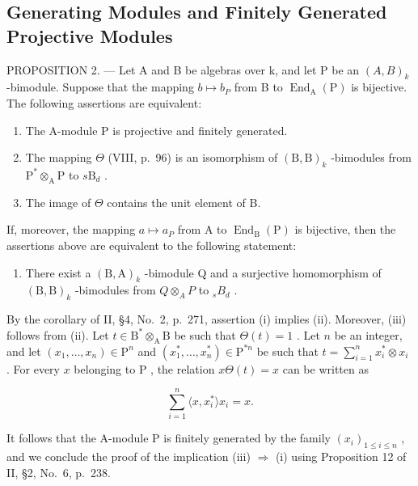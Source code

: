 \subsection{Generating Modules and Finitely Generated Projective Modules}

PROPOSITION 2. --- Let A and B be algebras over k, and let P be an \((A,B)_{k}\) -bimodule. Suppose that the mapping \(b \mapsto b_{P}\) from B to \(\operatorname{End}_{\mathrm{A}}(\mathrm{P})\) is bijective. The following assertions are equivalent:

\begin{enumerate}
\def\labelenumi{(\roman{enumi})}
\item
  The A-module P is projective and finitely generated.
\item
  The mapping \(\Theta\) (VIII, p.~96) is an isomorphism of \((\mathrm{B},\mathrm{B})_k\) -bimodules from \(\mathrm{P}^* \otimes_{\mathrm{A}} \mathrm{P}\) to \(s\mathrm{B}_d\) .
\item
  The image of \(\Theta\) contains the unit element of B.
\end{enumerate}

If, moreover, the mapping \(a \mapsto a_{P}\) from A to \(\operatorname{End}_{\mathrm{B}}(\mathrm{P})\) is bijective, then the assertions above are equivalent to the following statement:

\begin{enumerate}
\def\labelenumi{(\roman{enumi})}
\setcounter{enumi}{3}
\tightlist
\item
  There exist a \((\mathrm{B},\mathrm{A})_{k}\) -bimodule Q and a surjective homomorphism of \((\mathrm{B},\mathrm{B})_{k}\) -bimodules from \(Q\otimes_{A}P\) to \(_{s}B_{d}\) .
\end{enumerate}

By the corollary of II, §4, No.~2, p.~271, assertion (i) implies (ii). Moreover, (iii) follows from (ii). Let \(t \in \mathrm{B}^* \otimes_{\mathrm{A}} \mathrm{B}\) be such that \(\Theta(t) = 1\) . Let \(n\) be an integer, and let \((x_1, \ldots, x_n) \in \mathrm{P}^n\) and \((x_1^*, \ldots, x_n^*) \in \mathrm{P}^{*n}\) be such that \(t = \sum_{i=1}^{n} x_i^* \otimes x_i\) . For every \(x\) belonging to \(\mathrm{P}\) , the relation \(x\Theta(t) = x\) can be written as

\[
\sum_ {i = 1} ^ {n} \langle x, x _ {i} ^ {*} \rangle x _ {i} = x.
\]

It follows that the A-module P is finitely generated by the family \((x_{i})_{1\leqslant i\leqslant n}\) , and we conclude the proof of the implication (iii) \(\Rightarrow\) (i) using Proposition 12 of II, §2, No.~6, p.~238.

